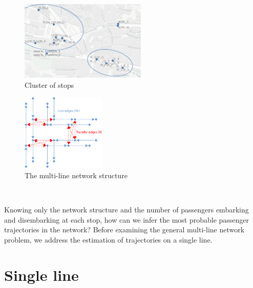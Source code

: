 \documentclass{bmcart}
\begin{document}
\noindent \begin{minipage}[c]{0.5\textwidth}
   \begin{figure}[H]
      \centering
      \includegraphics[width=6cm]{img/stop_area_c.png}
      \caption{Cluster of stops} 
      \label{fig:map-lausanne}
   \end{figure}
\end{minipage}%
\begin{minipage}[c]{0.5\textwidth}
   \begin{figure}[H]
      \centering
      \includegraphics[width=4cm]{img/edge_type3.png}
      \caption{The multi-line network structure} 
      \label{fig:network-lausanne}
   \end{figure}
\end{minipage}


$\mbox{}$

Knowing only the network structure and the number of passengers embarking and disembarking at each stop, how can we infer the most probable passenger trajectories in the network? Before examining the general multi-line network problem,  we address the estimation of trajectories on a single line.

%
\section{Single line}
%
\end{document}
